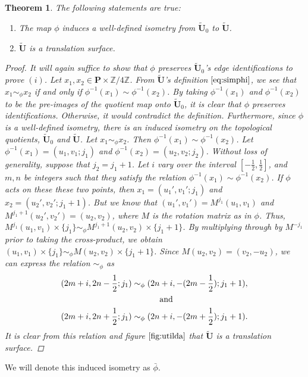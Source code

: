 \documentclass[]{article}
\newtheorem{thm}{Theorem}[section]
\begin{document}
\begin{thm}{The following statements are true:}
\begin{enumerate}[label=(\roman*)]
\item The map $\phi$ induces a well-defined isometry from $\tilde{\mathbf{U}}_0$ to $\tilde{\mathbf{U}}$.
\item $\tilde{\mathbf{U}}$ is a translation surface.
\end{enumerate}
\begin{proof}
It will again suffice to show that $\phi$ preserves $\tilde{\mathbf{U}}_0$'s edge identifications to prove $(i)$. Let $x_1,x_2\in\mathbf{P}\times\mathbb{Z}/4\mathbb{Z}$. From $\tilde{\mathbf{U}}$'s definition $\eqref{eq:simphi}$, we see that $x_1\sim_{\phi} x_2$ if and only if $\phi^{-1}(x_1) \sim \phi^{-1}(x_2)$. By taking $\phi^{-1}(x_1)$ and $ \phi^{-1}(x_2)$ to be the pre-images of the quotient map onto $\tilde{\mathbf{U}}_0$, it is clear that $\phi$ preserves identifications. Otherwise, it would contradict the definition. Furthermore, since $\phi$ is a well-defined isometry, there is an induced isometry on the topological quotients, $\tilde{\mathbf{U}}_0$ and $\tilde{\mathbf{U}}$.\newline
Let $x_1\sim_{\phi} x_2$. Then $\phi^{-1}(x_1) \sim \phi^{-1}(x_2)$. Let $\phi^{-1}(x_1)=(u_1,v_1;j_1)$ and $\phi^{-1}(x_2)=(u_2,v_2;j_2)$. Without loss of generality, suppose that $j_2=j_1+1$. Let $i$ vary over the interval $[-\frac{1}{2},\frac{1}{2}]$, and $m,n$ be integers such that they satisfy the relation $\phi^{-1}(x_1) \sim \phi^{-1}(x_2)$. If $\phi$ acts on these these two points, then $x_1 = (u_1',v_1';j_1)$ and $x_2 = (u_2',v_2';j_1+1)$. But we know that $(u_1',v_1')=M^{j_1}(u_1,v_1)$ and $M^{j_1+1}(u_2',v_2')=(u_2,v_2)$, where $M$ is the rotation matrix as in $\phi$. Thus, $M^{j_1}(u_1,v_1)\times\{j_1\}\sim_\phi M^{j_1+1}(u_2,v_2)\times\{j_1+1\}$. By multiplying through by $M^{-j_1}$ prior to taking the cross-product, we obtain $(u_1,v_1)\times\{j_1\}\sim_\phi M(u_2,v_2)\times\{j_1+1\}$. Since $M(u_2,v_2) = (v_2,-u_2)$, we can express the relation $\sim_\phi$ as
\begin{equation*}
\begin{split}
(2m+i, 2n-\frac{1}{2};j_1)\sim_\phi(2n+i, -(2m-\frac{1}{2});j_1+1),\\
\text{ and }\hspace{1.2in}\\
(2m+i, 2n+\frac{1}{2};j_1)\sim_\phi(2n+i, -(2m+\frac{1}{2});j_1+1).\\
\end{split}
\end{equation*}
It is clear from this relation and figure $\ref{fig:utilda}$ that $\tilde{\mathbf{U}}$ is a translation surface.
\end{proof}
\end{thm}
We will denote this induced isometry as $\bar{\phi}$.
\end{document}
